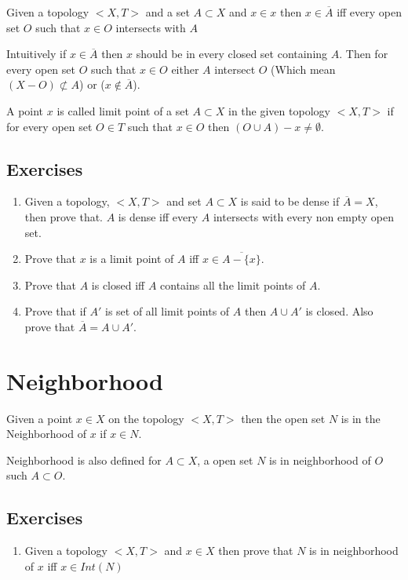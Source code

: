 \documentclass[twosides, openany]{tufte-book}
\begin{document}
Given a topology $<X, T>$ and a set $A \subset X$ and $x \in x$ then 
$x \in \overline{A}$ iff every open set $O$ such that $x \in O$ intersects with $A$ 

Intuitively if $x \in \overline{A}$ then $x$ should be in every closed set containing $A$. Then for every open set $O$ such that $x \in O$ either $A$ intersect $O$ (Which mean $(X - O) \not\subset A$) or ($x \notin \overline{A}$).

A point $x$ is called limit point of a set $A \subset X$ in the given topology $<X, T>$ if for every open set $O \in T$ such that $x \in O$ then $(O \cup A) - {x} \neq \emptyset$. 
\section{Exercises}
\begin{enumerate}
    \item Given a topology, $<X, T>$ and set $A \subset X$ is said to be dense if $\overline{A} = X$, then prove that.
    $A$ is dense iff every $A$ intersects with every non empty open set.
    \item Prove that $x$ is a limit point of $A$ iff $x \in \overline{A - \{x\}}$.
    \item Prove that $A$ is closed iff $A$ contains all the limit points of $A$.
    \item Prove that if $A'$ is set of all limit points of $A$ then $A \cup A'$ is closed. Also prove that $\overline{A} = A \cup A'$.
\end{enumerate}

\chapter{Neighborhood}
Given a point $x \in X$ on the topology $<X, T>$ then the open set $N$ is in the Neighborhood of $x$ if $x \in N$. 

Neighborhood is also defined for $A \subset X$, a open set $N$ is in neighborhood of $O$ such $A \subset O$. 

\section{Exercises}
\begin{enumerate}
\item Given a topology $<X, T>$ and $x \in X$ then prove that $N$ is in neighborhood of $x$ iff $x \in Int(N)$
\end{enumerate}
\end{document}
